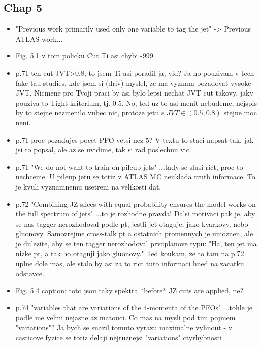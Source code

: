 \subsection{Chap 5}
\begin{itemize} 
\item "Previous work primarily used only one variable to tag the jet" -> 
Previous ATLAS work...
\item Fig. 5.1 v tom policku Cut Ti asi chybi -999
\item p.71 ten cut JVT>0.8, to jsem Ti asi poradil ja, vid? Ja ho pouzivam v 
tech fake tau studies, kde jsem si (driv) myslel, ze ma vyznam pozadovat 
vysoke JVT. Nicmene pro Tvoji praci by asi bylo lepsi nechat JVT cut 
takovy, jaky pouziva to Tight kriterium, tj. 0.5. No, ted uz to asi 
menit nebudeme, nejspis by to stejne nezmenilo vubec nic, protoze jetu s 
$JVT \in (0.5, 0.8)$ stejne moc neni.
\item p.71 proc pozadujes pocet PFO vetsi nez 5? V textu to staci napsat 
tak, jak jsi to popsal, ale az se uvidime, tak si rad poslechnu vic.
\item p.71 "We do not want to train on pileup jets" ...tady se slusi rict, 
proc to nechceme. U pileup jetu se totiz v ATLAS MC neuklada truth 
informace. To je kvuli vyznamnemu usetreni na velikosti dat.
\item p.72 "Combining JZ slices with equal probability ensures the model 
works on the full spectrum of jets" ...to je rozhodne pravda! Dalsi 
motivaci pak je, aby se nas tagger nerozhodoval podle pt, jestli jet 
otaguje, jako kvarkovy, nebo gluonovy. Samozrejme cross-talk pt a 
ostatnich promennych je umoznen, ale je dulezite, aby se ten tagger 
nerozhodoval prvoplanove typu: "Ha, ten jet ma nizke pt, a tak ho 
otaguji jako gluonovy." Ted koukam, ze to tam na p.72 uplne dole mas, 
ale stalo by asi za to rict tuto informaci hned na zacatku odstavce.
\item Fig. 5.4 caption: toto jsou taky spektra *before* JZ cuts are applied, ne?
\item p.74 "variables that are variations of the 4-momenta of the PFOs" 
...tohle je podle me velmi nejasne az matouci. Co mas na mysli pod tim 
pojmem "variations"? Ja bych se snazil tomuto vyrazu maximalne vyhnout - 
v casticove fyzice se totiz delaji nejruznejsi "variations" ctyrhybnosti 

\end{itemize}
